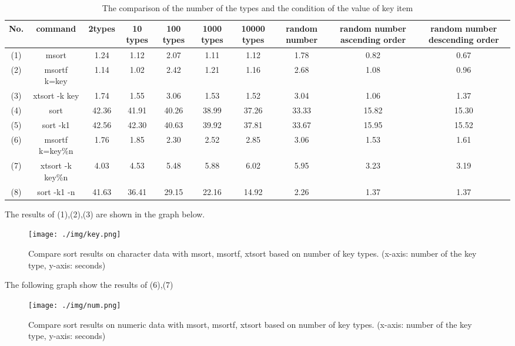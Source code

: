 \documentclass[a4paper]{jarticle}
\begin{document}
\begin{table}[h]
\begin{center}
\caption{The comparison of the number of the types and the condition of the value of key item}
 \begin{tabular}{cccccccccc}
\hline
No. & command & 2types & 10 types & 100 types & 1000 types & 10000 types & random number & random number ascending order & random number descending order\\
\hline
(1) & msort & 1.24 & 1.12 & 2.07 & 1.11 & 1.12 & 1.78 & 0.82 & 0.67\\
(2)	& msortf k=key & 1.14 & 1.02 & 2.42 & 1.21 & 1.16 & 2.68 & 1.08 & 0.96\\
(3)	& xtsort -k key & 1.74 & 1.55 & 3.06 & 1.53 & 1.52 & 3.04 & 1.06 & 1.37\\
(4)	& sort & 42.36 & 41.91 & 40.26 & 38.99 & 37.26 & 33.33 & 15.82 & 15.30\\
(5)	& sort -k1 & 42.56 & 42.30 & 40.63 & 39.92 & 37.81 & 33.67 & 15.95 & 15.52\\
(6)	& msortf k=key\%n & 1.76 & 1.85 & 2.30 & 2.52 & 2.85 & 3.06 & 1.53 & 1.61\\
(7)	& xtsort -k key\%n & 4.03 & 4.53 & 5.48 & 5.88 & 6.02 & 5.95 & 3.23 & 3.19\\
(8)	& sort -k1 -n & 41.63 & 36.41 & 29.15 & 22.16 & 14.92 & 2.26 & 1.37 & 1.37\\
\hline
 \end{tabular}
\end{center}
\end{table}
\newpage
The results of (1),(2),(3) are shown in the graph below. \\
\begin{figure}[!h]
\begin{center}
\texttt{[image: ./img/key.png]}
\end{center}
\caption{Compare sort results on character data with msort, msortf, xtsort based on number of key types. (x-axis: number of the key type, y-axis: seconds)}
\end{figure}

The following graph show the results of (6),(7)\\
\begin{figure}[!h]
\begin{center}
\texttt{[image: ./img/num.png]}
\end{center}
\caption{Compare sort results on numeric data with msort, msortf, xtsort based on number of key types. (x-axis: number of the key type, y-axis: seconds)}
\end{figure}
\end{document}
